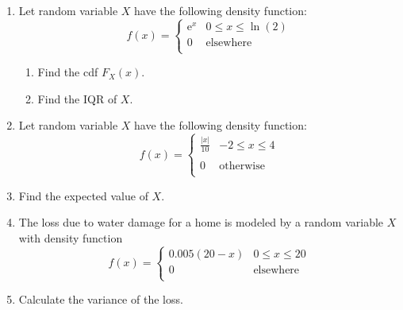 \documentclass{article}
\newcommand{\e}{\mathrm{e}}		%
\begin{document}
\begin{enumerate}
    \item Let random variable $X$ have the following density function: 
    \[
    f(x) =
        \left\{
        \begin{array}{ll}
             \e^x & 0 \le x \le \ln(2)\\
             0 & \text{elsewhere}\\
        \end{array}
        \right.
    \]
    \begin{enumerate}
        \item Find the cdf $F_X(x)$.
        \item Find the IQR of $X$.
    \end{enumerate}\bigskip%
    
    \item Let random variable $X$ have the following density function:
    \[
    f(x) =
        \left\{
        \begin{array}{ll}
             \displaystyle\frac{\lvert x \rvert}{10} & -2 \le x \le 4\\\\
             0 & \text{otherwise}\\
        \end{array}
        \right.
    \]
    \item[] Find the expected value of $X$.\bigskip%
    
    \item The loss due to water damage for a home is modeled by a random variable $X$ with density function
    \[
    f(x) =
        \left\{
        \begin{array}{ll}
             0.005(20 - x) & 0 \le x \le 20\\
             0 & \text{elsewhere}\\
        \end{array}
        \right.
    \]
    \item[] Calculate the variance of the loss.%
\end{enumerate}

\newpage
\end{document}
